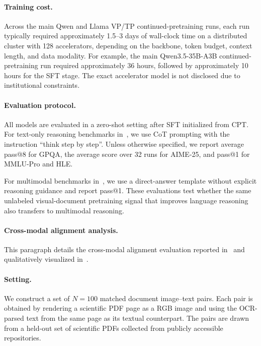 \paragraph{Training cost.}
Across the main Qwen and Llama VP/TP continued-pretraining runs, each run typically required approximately 1.5--3 days of wall-clock time on a distributed cluster with 128 accelerators, depending on the backbone,
token budget, context length, and data modality.
For example, the main Qwen3.5-35B-A3B continued-pretraining run required approximately 36 hours, followed by approximately 10 hours for the SFT stage.
The exact accelerator model is not disclosed due to institutional constraints.

\paragraph{Evaluation protocol.}
\label{sec:appendix_eval_protocol}

All models are evaluated in a zero-shot setting after SFT initialized from CPT. For text-only reasoning benchmarks in~, we use CoT prompting with the instruction ``think step by step''. Unless otherwise specified, we report average pass@8 for GPQA, the average score over 32 runs for AIME-25, and pass@1 for MMLU-Pro and HLE.

For multimodal benchmarks in~, we use a direct-answer template without explicit reasoning guidance and report pass@1. These evaluations test whether the same unlabeled visual-document pretraining signal that improves language reasoning also transfers to multimodal reasoning.

\paragraph{Cross-modal alignment analysis.}
\label{sec:appendix_alignment_details}

This paragraph details the cross-modal alignment evaluation reported in~ and qualitatively visualized in~.

\paragraph{Setting.}
We construct a set of $N{=}100$ matched document image--text pairs. 
Each pair is obtained by rendering a scientific PDF page as a RGB image and using the OCR-parsed text from the same page as its textual counterpart. The pairs are drawn from a held-out set of scientific PDFs collected from publicly accessible repositories.

